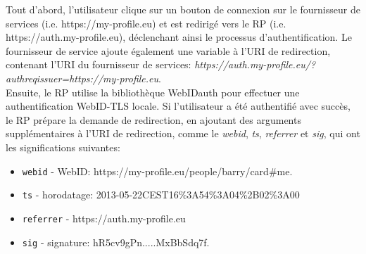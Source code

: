\documentclass[a4paper]{article}
\begin{document}
Tout d'abord, l'utilisateur clique sur un bouton de connexion sur le fournisseur de services (i.e. https://my-profile.eu) et est redirigé vers le RP (i.e. https://auth.my-profile.eu), déclenchant ainsi le processus d'authentification. Le fournisseur de service ajoute également une variable à l'URI de redirection, contenant l'URI du fournisseur de services: \textit{https://auth.my-profile.eu/?authreqissuer=https://my-profile.eu}.\\


Ensuite, le RP utilise la bibliothèque WebIDauth pour effectuer une authentification WebID-TLS locale. Si l'utilisateur a été authentifié avec succès, le RP prépare la demande de redirection, en ajoutant des arguments supplémentaires à l'URI de redirection, comme le \textit{webid}, \textit{ts}, \textit{referrer} et \textit{sig}, qui ont les significations suivantes:

\begin{itemize}
\item \verb+webid+ - WebID: https://my-profile.eu/people/barry/card\#me.
\item \verb+ts+ - horodatage: 2013-05-22CEST16\%3A54\%3A04\%2B02\%3A00
\item \verb+referrer+ - https://auth.my-profile.eu
\item \verb+sig+ - signature: hR5cv9gPn.....MxBbSdq7f.
\end{itemize}
\end{document}
